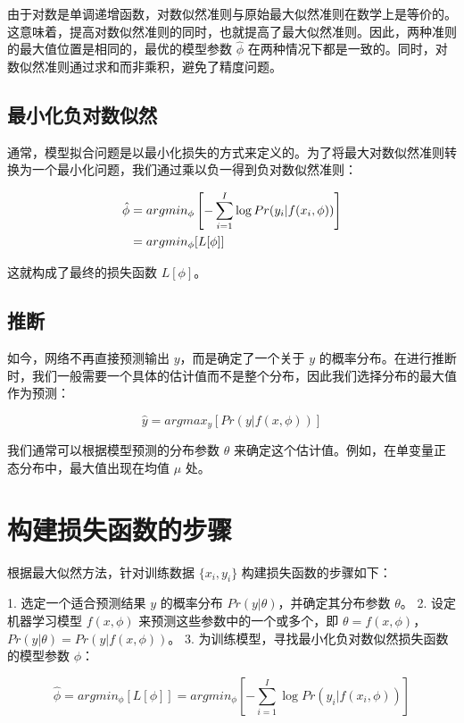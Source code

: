 \documentclass[lang=cn,newtx,10pt,scheme=chinese]{elegantbook}
\begin{document}
由于对数是单调递增函数，对数似然准则与原始最大似然准则在数学上是等价的。这意味着，提高对数似然准则的同时，也就提高了最大似然准则。因此，两种准则的最大值位置是相同的，最优的模型参数 \(\hat{\phi}\) 在两种情况下都是一致的。同时，对数似然准则通过求和而非乘积，避免了精度问题。
\subsection{最小化负对数似然}

通常，模型拟合问题是以最小化损失的方式来定义的。为了将最大对数似然准则转换为一个最小化问题，我们通过乘以负一得到负对数似然准则：


\begin{align}
	\hat{\phi} &= argmin_{\phi} \left[ - \sum_{i=1}^{I} \log Pr(y_i|f(x_i, \phi)) \right] \notag \\
	&= argmin_{\phi} [ L[\phi] ] 
\end{align}

这就构成了最终的损失函数 \(L[\phi]\)。

\subsection{推断}

如今，网络不再直接预测输出 \(y\)，而是确定了一个关于 \(y\) 的概率分布。在进行推断时，我们一般需要一个具体的估计值而不是整个分布，因此我们选择分布的最大值作为预测：

\begin{equation}
	\hat{y} = argmax_y [Pr(y|f(x, \phi))]  
\end{equation}


我们通常可以根据模型预测的分布参数 \(\theta\) 来确定这个估计值。例如，在单变量正态分布中，最大值出现在均值 \(\mu\) 处。


\section{构建损失函数的步骤}

根据最大似然方法，针对训练数据 \(\{x_i, y_i\}\) 构建损失函数的步骤如下：

1. 选定一个适合预测结果 \(y\) 的概率分布 \(Pr(y|\theta)\)，并确定其分布参数 \(\theta\)。
2. 设定机器学习模型 \(f(x, \phi)\) 来预测这些参数中的一个或多个，即 \(\theta = f(x, \phi)\)，\(Pr(y|\theta) = Pr(y|f(x, \phi))\)。
3. 为训练模型，寻找最小化负对数似然损失函数的模型参数 \(\phi\)：

\begin{equation}
	\hat{\phi} = argmin_{\phi} [ L[\phi] ] = argmin_{\phi} \left[ - \sum_{i=1}^{I} \log Pr(y_i|f(x_i, \phi)) \right] 
\end{equation}
\end{document}
